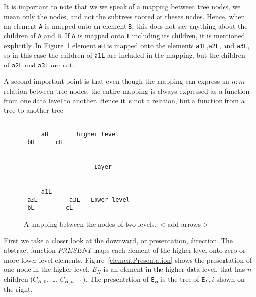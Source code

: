 It is important to note that we we speak of a mapping between tree nodes, we mean only the nodes, and not the subtrees rooted at theses nodes. Hence, when an element \verb|A| is mapped onto an element \verb|B|, this does not say anything about the children of \verb|A| and \verb|B|. If \verb|A| is mapped onto \verb|B| including its children, it is mentioned explicitly. In Figure~\ref{nodeMapping} element \verb|aH| is mapped onto the elements \verb|a1L|,\verb|a2L|, and \verb|a3L|, so in this case the children of \verb|a1L| are included in the mapping, but the children of \verb|a2L| and \verb|a3L| are not. 

A second important point is that even though the mapping can express an $n:m$ relation between tree nodes, the entire mapping is always expressed as a function from one data level to another. Hence it is not a relation, but a function from a tree to another tree.


\begin{figure}
\begin{center}
\begin{center}
\begin{verbatim}

     aH        higher level
 bH      cH
 

                    Layer

 
     a1L 
 a2L         a3L   Lower level
 bL         cL
\end{verbatim}
\end{center}
\caption{A mapping between the nodes of two levels. $<$add arrows$>$}\label{nodeMapping} 
\end{center}
\end{figure}



First we take a closer look at the downward, or presentation, direction. The abstract function $PRESENT$ maps each element of the higher level onto zero or more lower level elements. Figure~\ref{elementPresentation} shows the presentation of one node in the higher level. $E_H$ is an element in the higher data level, that has $n$ children ($C_{H,0}$, \dots, $C_{H,n-1}$). The presentation of \verb|E|$_H$ is the tree of \verb|E|$_L,i$ shown on the right.


